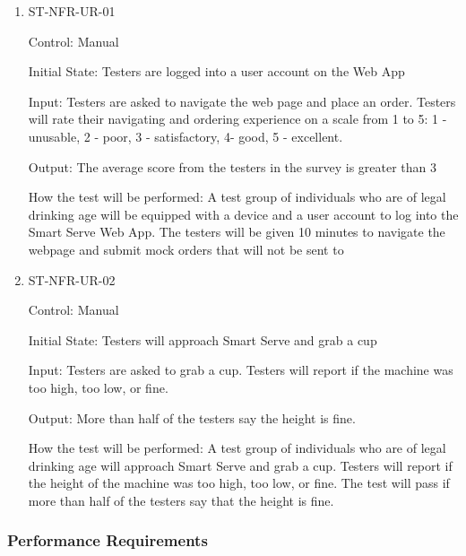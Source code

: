\documentclass[12pt, titlepage]{article}
\begin{document}
\begin{enumerate}

\item{ST-NFR-UR-01\\}

Control: Manual

Initial State: Testers are logged into a user account on the Web App

Input: Testers are asked to navigate the web page and place an order. Testers will rate their navigating and ordering experience on a scale from 1 to 5: 1 - unusable, 2 - poor, 3 - satisfactory, 4- good, 5 - excellent.

Output: The average score from the testers in the survey is greater than 3

How the test will be performed: A test group of individuals who are of legal drinking age will be equipped with a device and a user account to log into the Smart Serve Web App. The testers will be given 10 minutes to navigate the webpage and submit mock orders that will not be sent to 

\item{ST-NFR-UR-02\\}

Control: Manual

Initial State: Testers will approach Smart Serve and grab a cup

Input: Testers are asked to grab a cup. Testers will report if the machine was too high, too low, or fine.

Output:  More than half of the testers say the height is fine.

How the test will be performed: A test group of individuals who are of legal drinking age will approach Smart Serve and grab a cup. Testers will report if the height of the machine was too high, too low, or fine. The test will pass if more than half of the testers say that the height is fine.

\end{enumerate}

\subsubsection{Performance Requirements}
\end{document}
